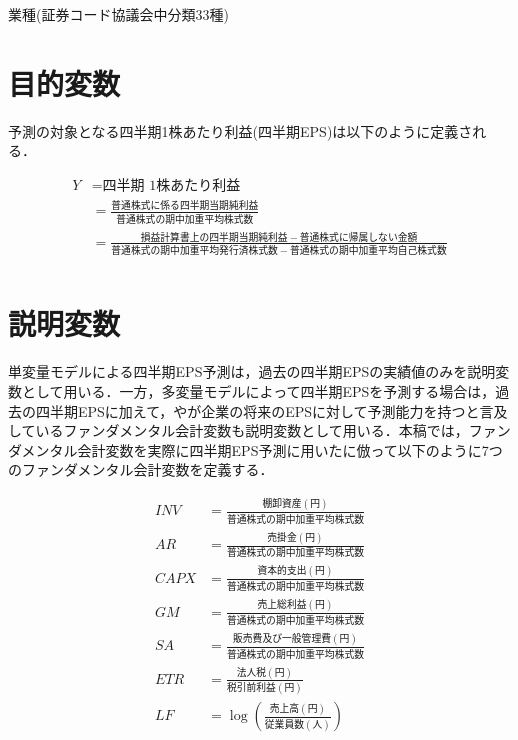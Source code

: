 \documentclass[a4paper，11pt]{jsarticle}
\begin{document}
\begin{table}[tbp]
  \centering
  \caption{業種(証券コード協議会中分類33種)}
  \label{tab:ind}
  \small
  
\end{table}

\section{目的変数}

予測の対象となる四半期1株あたり利益(四半期EPS)は以下のように定義される．

\begin{equation}
  \begin{split}
    Y &= \text{四半期 1株あたり利益} \\
    &= \frac{普通株式に係る四半期当期純利益}{普通株式の期中加重平均株式数} \\
    &= \frac{損益計算書上の四半期当期純利益-普通株式に帰属しない金額}{普通株式の期中加重平均発行済株式数 - 普通株式の期中加重平均自己株式数} \\  
  \end{split}
\end{equation}

\section{説明変数}

単変量モデルによる四半期EPS予測は，過去の四半期EPSの実績値のみを説明変数として用いる．一方，多変量モデルによって四半期EPSを予測する場合は，過去の四半期EPSに加えて，\cite{lev1993fundamental}や\cite{abarbanell1997fundamental}が企業の将来のEPSに対して予測能力を持つと言及しているファンダメンタル会計変数も説明変数として用いる．本稿では，ファンダメンタル会計変数を実際に四半期EPS予測に用いた\cite{zhang2004neural}に倣って以下のように7つのファンダメンタル会計変数を定義する．

\begin{equation}
  \begin{split}
    INV &= \frac{棚卸資産(円)}{普通株式の期中加重平均株式数} \\
    AR &= \frac{売掛金(円)}{普通株式の期中加重平均株式数} \\
    CAPX &= \frac{資本的支出(円)}{普通株式の期中加重平均株式数} \\
    GM &= \frac{売上総利益(円)}{普通株式の期中加重平均株式数} \\
    SA &= \frac{販売費及び一般管理費(円)}{普通株式の期中加重平均株式数} \\
    ETR &= \frac{法人税(円)}{税引前利益(円)} \\
    LF &= \log{\left(\frac{売上高(円)}{従業員数(人)}\right)} \\
  \end{split}
\end{equation}
\end{document}
